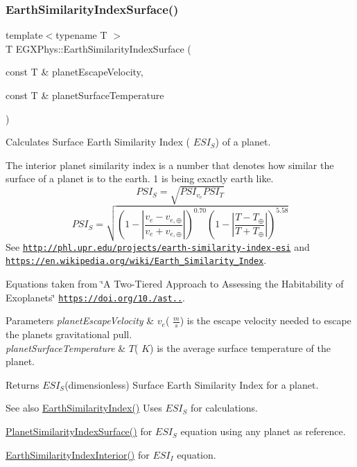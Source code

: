 \subsubsection{\texorpdfstring{Earth\+Similarity\+Index\+Surface()}{EarthSimilarityIndexSurface()}}
{\footnotesize\ttfamily template$<$typename T $>$ \\
T E\+G\+X\+Phys\+::\+Earth\+Similarity\+Index\+Surface (\begin{DoxyParamCaption}\item[{const T \&}]{planet\+Escape\+Velocity,  }\item[{const T \&}]{planet\+Surface\+Temperature }\end{DoxyParamCaption})}



Calculates Surface Earth Similarity Index ( $ESI_S$) of a planet. 

The interior planet similarity index is a number that denotes how similar the surface of a planet is to the earth. 1 is being exactly earth like. \[PSI_S=\sqrt{PSI_{v_e} PSI_T}\] \[PSI_S=\sqrt{\left ( 1 - \left | \frac{v_e-v_{e,\oplus}}{v_e+v_{e,\oplus}} \right | \right )^{0.70} \left ( 1 - \left | \frac{T-T_{\oplus}}{T+T_{\oplus}} \right | \right )^{5.58}}\] See \href{http://phl.upr.edu/projects/earth-similarity-index-esi}{\tt http\+://phl.\+upr.\+edu/projects/earth-\/similarity-\/index-\/esi} and \href{https://en.wikipedia.org/wiki/Earth_Similarity_Index}{\tt https\+://en.\+wikipedia.\+org/wiki/\+Earth\+\_\+\+Similarity\+\_\+\+Index}.

Equations taken from \char`\"{}\+A Two-\/\+Tiered Approach to Assessing the Habitability of Exoplanets\char`\"{} \href{https://doi.org/10.1089/ast.2010.0592}{\tt https\+://doi.\+org/10./ast..}.


\begin{DoxyParams}{Parameters}
{\em planet\+Escape\+Velocity} & $v_e$( $\frac{m}{s}$) is the escape velocity needed to escape the planet\textquotesingle{}s gravitational pull. \\
\hline
{\em planet\+Surface\+Temperature} & $T$( $K$) is the average surface temperature of the planet. \\
\hline
\end{DoxyParams}
\begin{DoxyReturn}{Returns}
$ESI_S$(dimensionless) Surface Earth Similarity Index for a planet. 
\end{DoxyReturn}
\begin{DoxySeeAlso}{See also}
\hyperlink{group___astrophysics_ga4b86397b1c839c49ac599d49fda207d4}{Earth\+Similarity\+Index()} Uses $ESI_S$ for calculations. 

\hyperlink{group___astrophysics_gae0c7dce2779d66b0560ca388a34ddc39}{Planet\+Similarity\+Index\+Surface()} for $ESI_S$ equation using any planet as reference. 

\hyperlink{group___astrophysics_ga699bcc2f17b8855eaa856595d8032f61}{Earth\+Similarity\+Index\+Interior()} for $ESI_I$ equation. 
\end{DoxySeeAlso}
\mbox{\label{group___astrophysics_ga4414ac75539371ec874a3d25cad6c9fe}} 
